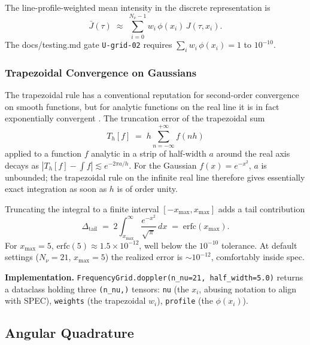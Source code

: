 \documentclass[11pt]{article}
\newcommand{\Jbar}{\bar{J}}
\newcommand{\code}[1]{\texttt{#1}}
\begin{document}
The line-profile-weighted mean intensity in the discrete representation is
\begin{equation}
\Jbar(\tau) \;\approx\; \sum_{i=0}^{N_\nu - 1} w_i \,\phi(x_i)\, J(\tau, x_i).
\label{eq:Jbar-discrete}
\end{equation}
The docs/testing.md gate \texttt{U-grid-02} requires
$\sum_i w_i \,\phi(x_i) = 1$ to $10^{-10}$.

\subsubsection{Trapezoidal Convergence on Gaussians}

The trapezoidal rule has a conventional reputation for second-order
convergence on smooth functions, but for analytic functions on the
real line it is in fact exponentially convergent
\citep{TrefethenWeideman2014}.  The truncation error of the
trapezoidal sum
\begin{equation}
T_h[f] \;=\; h \sum_{n=-\infty}^{+\infty} f(n h)
\end{equation}
applied to a function $f$ analytic in a strip of half-width $a$ around
the real axis decays as $|T_h[f] - \int f| \lesssim e^{-2\pi a / h}$.
For the Gaussian $f(x) = e^{-x^2}$, $a$ is unbounded; the trapezoidal
rule on the infinite real line therefore gives essentially exact
integration as soon as $h$ is of order unity.

Truncating the integral to a finite interval $[-x_{\max}, x_{\max}]$
adds a tail contribution
\begin{equation}
\Delta_{\text{tail}} \;=\; 2 \int_{x_{\max}}^\infty \frac{e^{-x^2}}{\sqrt{\pi}}\, dx
\;=\; \mathrm{erfc}(x_{\max}).
\end{equation}
For $x_{\max} = 5$, $\mathrm{erfc}(5) \approx 1.5 \times 10^{-12}$,
well below the $10^{-10}$ tolerance.  At default settings ($N_\nu =
21$, $x_{\max} = 5$) the realized error is $\sim 10^{-12}$, comfortably
inside spec.

\textbf{Implementation.} \code{FrequencyGrid.doppler(n\_nu=21, half\_width=5.0)}
returns a dataclass holding three \code{(n\_nu,)} tensors: \code{nu} (the
$x_i$, abusing notation to align with SPEC), \code{weights} (the trapezoidal
$w_i$), \code{profile} (the $\phi(x_i)$).

\subsection{Angular Quadrature}
\label{sec:angle-quad}
\end{document}

